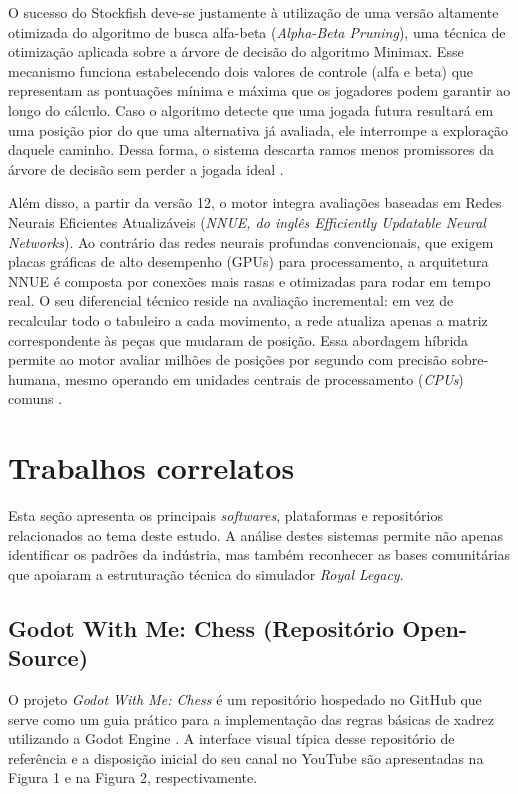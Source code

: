 O sucesso do Stockfish deve-se justamente à utilização de uma versão altamente otimizada do algoritmo de busca alfa-beta (\textit{Alpha-Beta Pruning}), uma técnica de otimização aplicada sobre a árvore de decisão do algoritmo Minimax. Esse mecanismo funciona estabelecendo dois valores de controle (alfa e beta) que representam as pontuações mínima e máxima que os jogadores podem garantir ao longo do cálculo. Caso o algoritmo detecte que uma jogada futura resultará em uma posição pior do que uma alternativa já avaliada, ele interrompe a exploração daquele caminho. Dessa forma, o sistema descarta ramos menos promissores da árvore de decisão sem perder a jogada ideal \cite{Amorim2002}.

Além disso, a partir da versão 12, o motor integra avaliações baseadas em Redes Neurais Eficientes Atualizáveis (\textit{NNUE, do inglês Efficiently Updatable Neural Networks}). Ao contrário das redes neurais profundas convencionais, que exigem placas gráficas de alto desempenho (GPUs) para processamento, a arquitetura NNUE é composta por conexões mais rasas e otimizadas para rodar em tempo real. O seu diferencial técnico reside na avaliação incremental: em vez de recalcular todo o tabuleiro a cada movimento, a rede atualiza apenas a matriz correspondente às peças que mudaram de posição. Essa abordagem híbrida permite ao motor avaliar milhões de posições por segundo com precisão sobre-humana, mesmo operando em unidades centrais de processamento (\textit{CPUs}) comuns \cite{Stockfish2023}.

\section{Trabalhos correlatos}
\label{secao:trabalhos_correlatos}

Esta seção apresenta os principais \textit{softwares}, plataformas e repositórios relacionados ao tema deste estudo. A análise destes sistemas permite não apenas identificar os padrões da indústria, mas também reconhecer as bases comunitárias que apoiaram a estruturação técnica do simulador \textit{Royal Legacy}.

\subsection{Godot With Me: Chess (Repositório Open-Source)}

O projeto \textit{Godot With Me: Chess} é um repositório hospedado no GitHub que serve como um guia prático para a implementação das regras básicas de xadrez utilizando a Godot Engine \cite{GodotWithMe2023, GodotWithMeVideo}. A interface visual típica desse repositório de referência e a disposição inicial do seu canal no YouTube são apresentadas na Figura 1 e na Figura 2, respectivamente.

